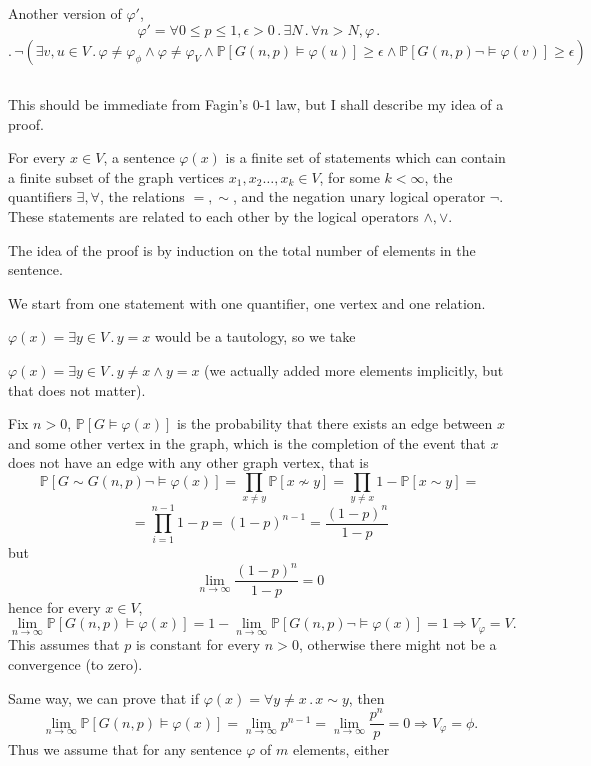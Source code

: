 \documentclass{article}
\begin{document}
Another version of $\varphi'$,
\noindent
\[\varphi'=\forall{0\leq{p}\leq{1}},\epsilon>0\,.\,\exists{N}\,.\,\forall{n>N},\varphi\,.\,\]\[.\,\neg(\exists{v,u\in{V}}\,.\,\varphi\neq\varphi_\phi\land\varphi\neq\varphi_V\land\mathbb{P}[G(n,p)\vDash\varphi(u)]\geq\epsilon\land\mathbb{P}[G(n,p)\neg\vDash\varphi(v)]\geq\epsilon)\]
\subsection{}
This should be immediate from Fagin's 0-1 law, but I shall describe my idea of a proof.

For every $x\in{V}$, a sentence $\varphi(x)$ is a finite set of statements which can contain a finite subset of the graph vertices $x_1,x_2\dots,x_k\in{V}$, for some $k<\infty$, the quantifiers $\exists,\forall$, the relations $=,\sim$, and the negation unary logical operator $\neg$. These statements are related to each other by the logical operators $\land,\lor$.

The idea of the proof is by induction on the total number of elements in the sentence.

We start from one statement with one quantifier, one vertex and one relation.

$\varphi(x)=\exists{y\in{V}}\,.\,y={x}$ would be a tautology, so we take 

$\varphi(x)=\exists{y\in{V}}\,.\,y\neq{x}\land{y={x}}$ (we actually added more elements implicitly, but that does not matter).

Fix $n>0$, $\mathbb{P}[G\vDash\varphi(x)]$ is the probability that there exists an edge between $x$ and some other vertex in the graph, which is the completion of the event that $x$ does not have an edge with any other graph vertex, that is \[\mathbb{P}[G\sim{G(n,p)}\neg\vDash\varphi(x)]=\prod_{x\neq{y}}\mathbb{P}[x\nsim{y}]=\prod_{y\neq{x}}1-\mathbb{P}[x\sim{y}]=\]\[=\prod_{i=1}^{n-1}1-p=(1-p)^{n-1}=\frac{(1-p)^n}{1-p}\]
but \[\lim_{n\rightarrow\infty}\frac{(1-p)^n}{1-p}=0\]
hence for every $x\in{V}$, \[\lim_{n\rightarrow\infty}\mathbb{P}[G(n,p)\vDash\varphi(x)]=1-\lim_{n\rightarrow\infty}\mathbb{P}[G(n,p)\neg\vDash\varphi(x)]=1\Rightarrow{V_\varphi={V}}.\]
This assumes that $p$ is constant for every $n>0$, otherwise there might not be a convergence (to zero).

Same way, we can prove that if $\varphi(x)=\forall{y\neq{x}}\,.\,x\sim{y}$, then \[\lim_{n\rightarrow\infty}\mathbb{P}[G(n,p)\vDash\varphi(x)]=\lim_{n\rightarrow\infty}p^{n-1}=\lim_{n\rightarrow\infty}\frac{p^n}{p}=0\Rightarrow{V_\varphi=\phi}.\]
Thus we assume that for any sentence $\varphi$ of $m$ elements, either
\end{document}
